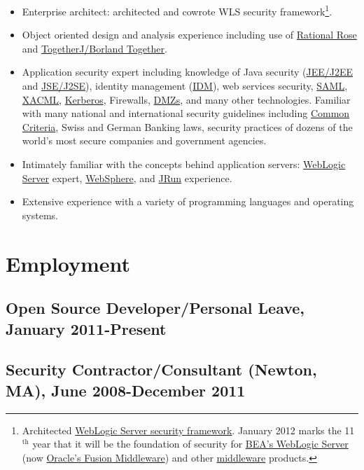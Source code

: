 \documentclass[11pt]{article}
\begin{document}
\begin{itemize}
\item Enterprise architect: architected and cowrote WLS security framework\footnote{Architected \href{http://bit.ly/AF3TMb}{WebLogic Server security framework}. January 2012 marks the 11$^{\mathrm{th}}$ year that it will be the foundation of security for \href{http://bit.ly/z23Zss }{BEA's WebLogic Server} (now \href{http://bit.ly/AF3TMb) }{Oracle's Fusion Middleware}) and other \href{http://en.wikipedia.org/wiki/Middleware}{middleware} products. }.
\item Object oriented design and analysis experience including use of \href{http://en.wikipedia.org/wiki/Rational_rose}{Rational Rose} and \href{http://en.wikipedia.org/wiki/Borland_Together}{TogetherJ/Borland Together}.
\item Application security expert including knowledge of Java security (\href{http://en.wikipedia.org/wiki/J2ee}{JEE/J2EE} and \href{http://en.wikipedia.org/wiki/J2ee}{JSE/J2SE}), identity management (\href{http://en.wikipedia.org/wiki/Idm}{IDM}), web services security, \href{http://en.wikipedia.org/wiki/SAML}{SAML}, \href{http://en.wikipedia.org/wiki/XACML}{XACML}, \href{http://en.wikipedia.org/wiki/Kerberos_(protocol)}{Kerberos}, Firewalls, \href{http://en.wikipedia.org/wiki/DMZ_(computing)}{DMZs}, and many other technologies. Familiar with many national and international security guidelines including \href{http://en.wikipedia.org/wiki/Common_criteria}{Common Criteria}, Swiss and German Banking laws, security practices of dozens of the world's most secure companies and government agencies.
\item Intimately familiar with the concepts behind application servers: \href{http://en.wikipedia.org/wiki/Oracle_WebLogic_Server}{WebLogic Server} expert, \href{http://en.wikipedia.org/wiki/Websphere}{WebSphere}, and \href{http://en.wikipedia.org/wiki/Jrun}{JRun} experience.
\item Extensive experience with a variety of programming languages and operating systems.
\end{itemize}
\section*{Employment}
\label{sec-4}
\subsection*{Open Source Developer/Personal Leave, January 2011-Present}
\label{sec-4-1}
\subsection*{Security Contractor/Consultant (Newton, MA), June 2008-December 2011}
\label{sec-4-2}
\end{document}
